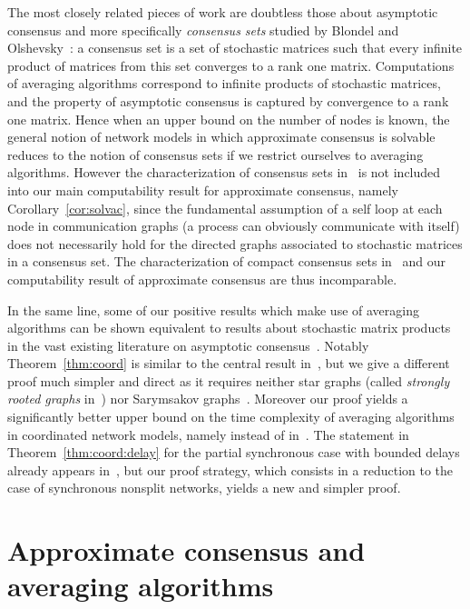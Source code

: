 \documentclass[a4paper]{article}
\theoremstyle{newthm}
\begin{document}
The most closely related pieces of work are doubtless those about asymptotic consensus
	and more specifically  {\em consensus sets} studied by Blondel and Olshevsky~\cite{BO13}:
	a consensus set is a set of stochastic matrices such that every infinite product of
	matrices from this set converges to a rank one matrix.
Computations of averaging algorithms correspond to infinite products of stochastic 
	matrices, and the property of asymptotic consensus is captured by  convergence to a rank one
	matrix.
Hence when an upper bound on the number of nodes is known, the general 
	notion  of  network models in which approximate consensus
	is solvable  reduces to the notion of consensus sets 
	if  we restrict ourselves to averaging algorithms.
However the characterization of consensus sets in~\cite{BO13}  is not  included into
	our main computability result for approximate consensus, namely Corollary~\ref{cor:solvac},
	since the fundamental assumption of a self loop at each node in  communication graphs
	(a process can obviously communicate with itself)
	does not necessarily hold for the directed graphs associated to  stochastic matrices in a consensus set.
The characterization of compact consensus sets in~\cite{BO13} and our computability result of
	approximate consensus  are thus incomparable.

In the same line, some of  our positive results which make use of averaging algorithms
	can be shown equivalent to results about stochastic matrix products in the
	vast existing literature on asymptotic consensus~\cite{DeG74,CS77,Mor05,AB06,
	CMA08a,LL10,TN11,LMMAY11,Cha13,XC12,HT13,Now13}.
Notably Theorem~\ref{thm:coord} 
	is  similar to the central result in~\cite{CMA08a}, but
	we give a different proof much simpler and direct as it requires neither
	star graphs (called {\em strongly rooted graphs}  in~\cite{CMA08a}) nor 
	Sarymsakov graphs~\cite{XC12}.
Moreover our proof yields a significantly better upper bound on the time complexity of averaging algorithms 
	in coordinated network models, namely 	 instead
	of  in~\cite{CMA08b}.
The  statement in Theorem~\ref{thm:coord:delay} for the partial synchronous case with bounded delays
	already appears in~\cite{CMA08b,Cha13},
	but our proof strategy, which consists in a reduction to the case of synchronous nonsplit
	networks, yields  a new and simpler proof.



\section{Approximate consensus and averaging algorithms}
\end{document}

